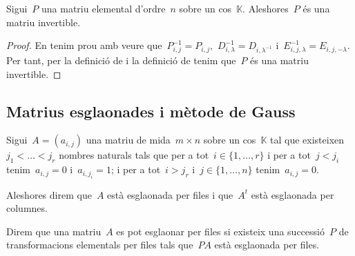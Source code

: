 \documentclass[../../main.tex]{subfiles}
\begin{document}
	\begin{proposition}
		\label{prop:les matrius elementals són invertibles}
		Sigui~\(P\) una matriu elemental d'ordre~\(n\) sobre un cos~\(\mathbb{K}\).
		Aleshores~\(P\) és una matriu invertible.
		\begin{proof}
			En tenim prou amb veure que~\(P_{i,j}^{-1}=P_{i,j}\),~\(D_{i,\lambda}^{-1}=D_{i,\lambda^{-1}}\) i~\(E_{i,j,\lambda}^{-1}=E_{i,j,-\lambda}\).
			Per tant, per la definició de  i la definició de  tenim que~\(P\) és una matriu invertible.
		\end{proof}
	\end{proposition}
	\subsection{Matrius esglaonades i mètode de Gauss}
	\begin{definition}
		\label{def:matriu esglaonada}
		Sigui~\(A=(a_{i,j})\) una matriu de mida~\(m\times n\) sobre un cos~\(\mathbb{K}\) tal que existeixen~\(j_{1}<\dots<j_{r}\) nombres naturals tals que per a tot~\(i\in\{1,\dots,r\}\) i per a tot~\(j<j_{i}\) tenim~\(a_{i,j}=0\) i~\(a_{i,j_{i}}=1\); i per a tot~\(i>j_{r}\) i~\(j\in\{1,\dots,n\}\) tenim~\(a_{i,j}=0\).

		Aleshores direm que~\(A\) està esglaonada per files i que~\(A^{t}\) està esglaonada per columnes.

		Direm que una matriu~\(A\) es pot esglaonar per files si existeix una successió~\(P\) de transformacions elementals per files tals que~\(PA\) està esglaonada per files.
	\end{definition}
\end{document}
